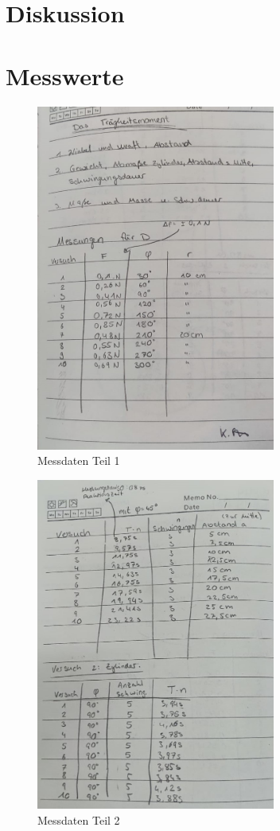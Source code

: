 \section{Diskussion}
\label{sec:Diskussion}
\newpage

\section{Messwerte}
\begin{figure}
    \centering
    \includegraphics[width=0.7\textwidth]{index.jpg}
    \caption{Messdaten Teil 1}
    \label{fig:M1}
  \end{figure}

\begin{figure}
    \centering
    \includegraphics[width=0.7\textwidth]{index2.jpg}
    \caption{Messdaten Teil 2}
    \label{fig:M1}
\end{figure}

